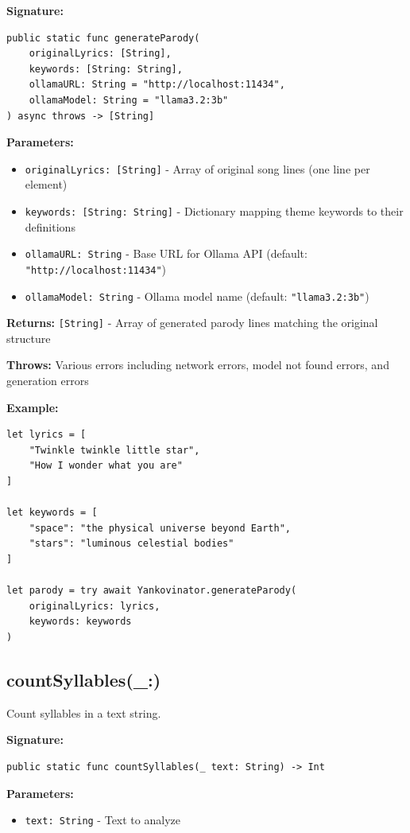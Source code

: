 \documentclass[11pt,a4paper]{article}
\begin{document}
\textbf{Signature:}
\begin{lstlisting}
public static func generateParody(
    originalLyrics: [String],
    keywords: [String: String],
    ollamaURL: String = "http://localhost:11434",
    ollamaModel: String = "llama3.2:3b"
) async throws -> [String]
\end{lstlisting}

\textbf{Parameters:}
\begin{itemize}
    \item \texttt{originalLyrics: [String]} - Array of original song lines (one line per element)
    \item \texttt{keywords: [String: String]} - Dictionary mapping theme keywords to their definitions
    \item \texttt{ollamaURL: String} - Base URL for Ollama API (default: \texttt{"http://localhost:11434"})
    \item \texttt{ollamaModel: String} - Ollama model name (default: \texttt{"llama3.2:3b"})
\end{itemize}

\textbf{Returns:} \texttt{[String]} - Array of generated parody lines matching the original structure

\textbf{Throws:} Various errors including network errors, model not found errors, and generation errors

\textbf{Example:}
\begin{lstlisting}
let lyrics = [
    "Twinkle twinkle little star",
    "How I wonder what you are"
]

let keywords = [
    "space": "the physical universe beyond Earth",
    "stars": "luminous celestial bodies"
]

let parody = try await Yankovinator.generateParody(
    originalLyrics: lyrics,
    keywords: keywords
)
\end{lstlisting}

\subsection{countSyllables(\_:)}

Count syllables in a text string.

\textbf{Signature:}
\begin{lstlisting}
public static func countSyllables(_ text: String) -> Int
\end{lstlisting}

\textbf{Parameters:}
\begin{itemize}
    \item \texttt{text: String} - Text to analyze
\end{itemize}
\end{document}
